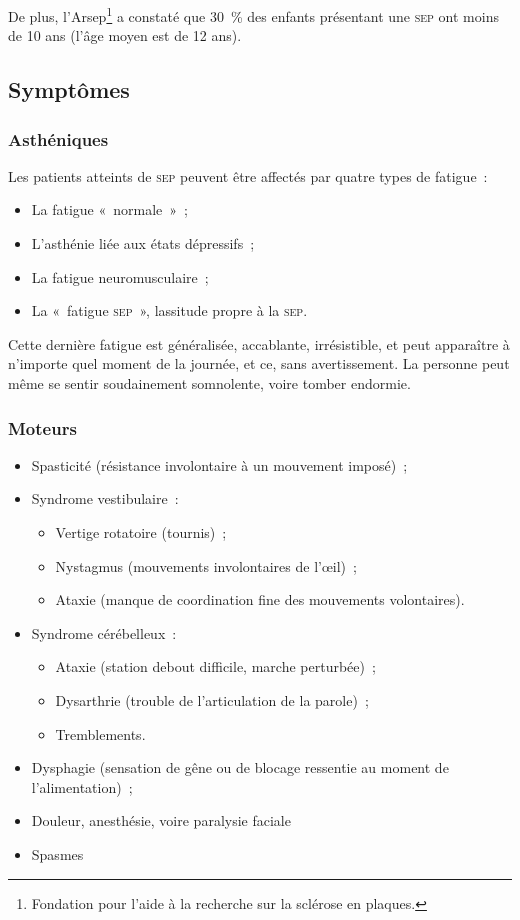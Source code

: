 \documentclass[a4paper,12pt,francais]{article}
\newcommand{\SEP}{\textsc{sep}\xspace}
\begin{document}
De plus, l’Arsep\footnote{Fondation pour l'aide à la recherche sur la sclérose en plaques.} a constaté que 30~\% des enfants présentant une \SEP{} ont moins de 10 ans (l’âge moyen est de 12 ans).

\subsection{Symptômes}

\subsubsection{Asthéniques}
Les patients atteints de \SEP{} peuvent être affectés par quatre types de fatigue~:
\begin{itemize}
    \item La fatigue «~normale~»~;
    \item L’asthénie liée aux états dépressifs~;
    \item La fatigue neuromusculaire~;
    \item La «~fatigue \SEP{}~», lassitude propre à la \SEP{}.
\end{itemize}

Cette dernière fatigue est généralisée, accablante, irrésistible, et peut apparaître à n’importe quel moment de la journée, et ce, sans avertissement. La personne peut même se sentir soudainement somnolente, voire tomber endormie.

\subsubsection{Moteurs}
\begin{itemize}
    \item Spasticité (résistance involontaire à un mouvement imposé)~;
    \item Syndrome vestibulaire~:
        \begin{itemize}
            \item Vertige rotatoire (tournis)~;
            \item Nystagmus (mouvements involontaires de l’œil)~;
            \item Ataxie (manque de coordination fine des mouvements volontaires).
        \end{itemize}
    \item Syndrome cérébelleux~:
        \begin{itemize}
            \item Ataxie (station debout difficile, marche perturbée)~;
            \item Dysarthrie (trouble de l’articulation de la parole)~;
            \item Tremblements.
        \end{itemize}
    \item Dysphagie (sensation de gêne ou de blocage ressentie au moment de l’alimentation)~;
    \item Douleur, anesthésie, voire paralysie faciale
    \item Spasmes
\end{itemize}
\end{document}
